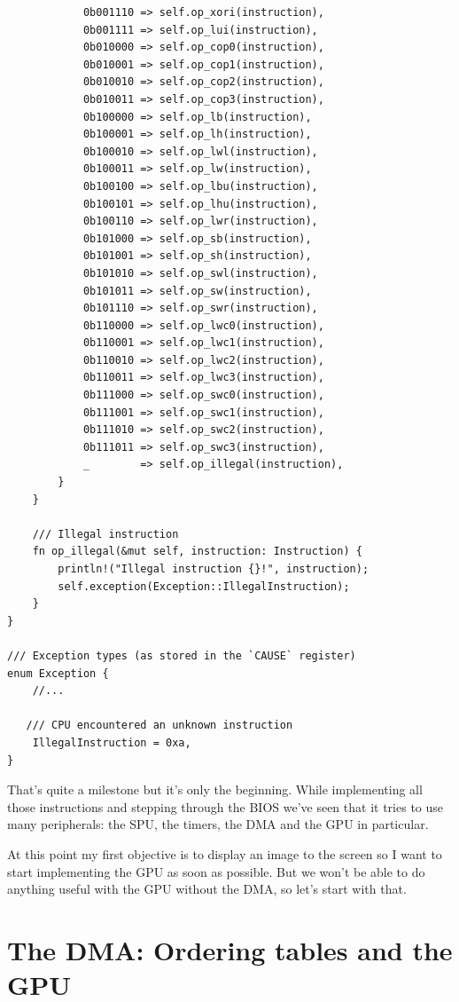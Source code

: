 \documentclass[a4paper]{article}
\begin{document}
\begin{lstlisting}
            0b001110 => self.op_xori(instruction),
            0b001111 => self.op_lui(instruction),
            0b010000 => self.op_cop0(instruction),
            0b010001 => self.op_cop1(instruction),
            0b010010 => self.op_cop2(instruction),
            0b010011 => self.op_cop3(instruction),
            0b100000 => self.op_lb(instruction),
            0b100001 => self.op_lh(instruction),
            0b100010 => self.op_lwl(instruction),
            0b100011 => self.op_lw(instruction),
            0b100100 => self.op_lbu(instruction),
            0b100101 => self.op_lhu(instruction),
            0b100110 => self.op_lwr(instruction),
            0b101000 => self.op_sb(instruction),
            0b101001 => self.op_sh(instruction),
            0b101010 => self.op_swl(instruction),
            0b101011 => self.op_sw(instruction),
            0b101110 => self.op_swr(instruction),
            0b110000 => self.op_lwc0(instruction),
            0b110001 => self.op_lwc1(instruction),
            0b110010 => self.op_lwc2(instruction),
            0b110011 => self.op_lwc3(instruction),
            0b111000 => self.op_swc0(instruction),
            0b111001 => self.op_swc1(instruction),
            0b111010 => self.op_swc2(instruction),
            0b111011 => self.op_swc3(instruction),
            _        => self.op_illegal(instruction),
        }
    }

    /// Illegal instruction
    fn op_illegal(&mut self, instruction: Instruction) {
        println!("Illegal instruction {}!", instruction);
        self.exception(Exception::IllegalInstruction);
    }
}

/// Exception types (as stored in the `CAUSE` register)
enum Exception {
    //...

   /// CPU encountered an unknown instruction
    IllegalInstruction = 0xa,
}
\end{lstlisting}

That's quite a milestone but it's only the beginning. While
implementing all those instructions and stepping through the BIOS
we've seen that it tries to use many peripherals: the SPU, the timers,
the DMA and the GPU in particular.

At this point my first objective is to display an image to the screen
so I want to start implementing the GPU as soon as possible. But we
won't be able to do anything useful with the GPU without the DMA, so
let's start with that.

\section{The DMA: Ordering tables and the GPU}
\end{document}
